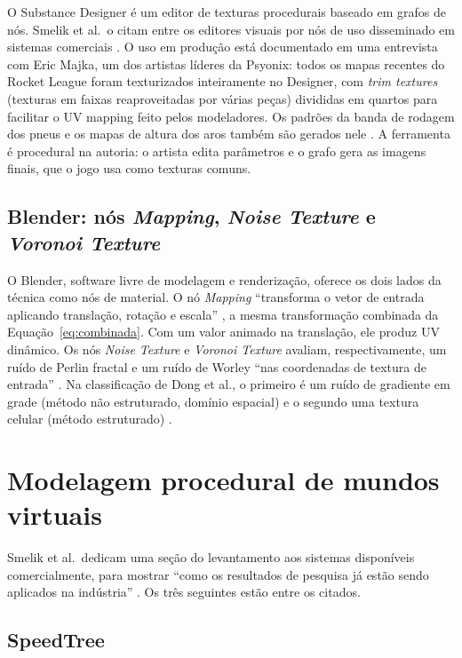 O Substance Designer é um editor de texturas procedurais baseado em grafos de nós. Smelik et al.\ o citam entre os editores visuais por nós de uso disseminado em sistemas comerciais \cite[p.~14]{smelik2014}. O uso em produção está documentado em uma entrevista com Eric Majka, um dos artistas líderes da Psyonix: todos os mapas recentes do Rocket League foram texturizados inteiramente no Designer, com \textit{trim textures} (texturas em faixas reaproveitadas por várias peças) divididas em quartos para facilitar o UV mapping feito pelos modeladores. Os padrões da banda de rodagem dos pneus e os mapas de altura dos aros também são gerados nele \cite{substance}. A ferramenta é procedural na autoria: o artista edita parâmetros e o grafo gera as imagens finais, que o jogo usa como texturas comuns.

\subsection{Blender: nós \textit{Mapping}, \textit{Noise Texture} e \textit{Voronoi Texture}}

O Blender, software livre de modelagem e renderização, oferece os dois lados da técnica como nós de material. O nó \textit{Mapping} ``transforma o vetor de entrada aplicando translação, rotação e escala'' \cite{blendermapping}, a mesma transformação combinada da Equação~\eqref{eq:combinada}. Com um valor animado na translação, ele produz UV dinâmico. Os nós \textit{Noise Texture} e \textit{Voronoi Texture} avaliam, respectivamente, um ruído de Perlin fractal e um ruído de Worley ``nas coordenadas de textura de entrada'' \cite{blendernoise,blendervoronoi}. Na classificação de Dong et al., o primeiro é um ruído de gradiente em grade (método não estruturado, domínio espacial) e o segundo uma textura celular (método estruturado) \cite[pp.~10, 16]{dong2020}.

\section{Modelagem procedural de mundos virtuais}

Smelik et al.\ dedicam uma seção do levantamento aos sistemas disponíveis comercialmente, para mostrar ``como os resultados de pesquisa já estão sendo aplicados na indústria'' \cite[p.~10]{smelik2014}. Os três seguintes estão entre os citados.

\subsection{SpeedTree}

